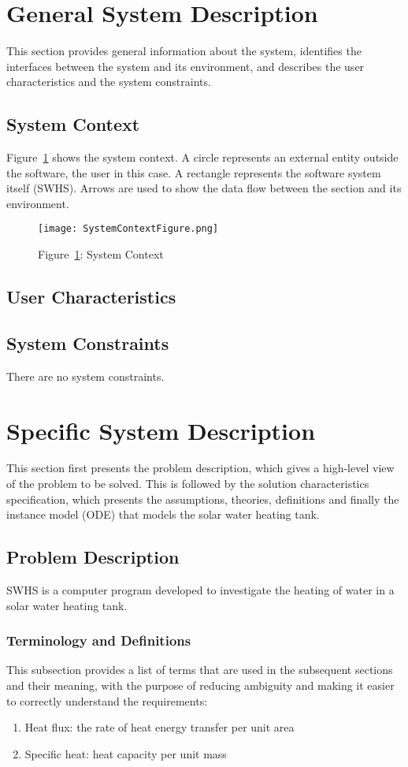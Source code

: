 \documentclass[12pt]{article}
\begin{document}
\section{General System Description}
\label{Sec:GeneSystDesc}
This section provides general information about the system, identifies the interfaces between the system and its environment, and describes the user characteristics and the system constraints.
\subsection{System Context}
\label{Sec:SystCont}
Figure~\ref{Figure::SystCont} shows the system context. A circle represents an external entity outside the software, the user in this case. A rectangle represents the software system itself (SWHS). Arrows are used to show the data flow between the section and its environment.
\begin{figure}
\begin{center}
\texttt{[image: SystemContextFigure.png]}
\caption{Figure~\ref{Figure::SystCont}: System Context}
\label{Figure::SystCont}
\end{center}
\end{figure}
\subsection{User Characteristics}
\label{Sec:UserChar}
\subsection{System Constraints}
\label{Sec:SystCons}
There are no system constraints.
\section{Specific System Description}
\label{Sec:SpecSystDesc}
This section first presents the problem description, which gives a high-level view of the problem to be solved. This is followed by the solution characteristics specification, which presents the assumptions, theories, definitions and finally the instance model (ODE) that models the solar water heating tank.
\subsection{Problem Description}
\label{Sec:ProbDesc}
SWHS is a computer program developed to investigate the heating of water in a solar water heating tank.
\subsubsection{Terminology and Definitions}
\label{Sec:TermandDefi}
This subsection provides a list of terms that are used in the subsequent sections and their meaning, with the purpose of reducing ambiguity and making it easier to correctly understand the requirements:
\begin{enumerate}
\item{Heat flux: the rate of heat energy transfer per unit area}
\item{Specific heat: heat capacity per unit mass}
\end{enumerate}
\end{document}
